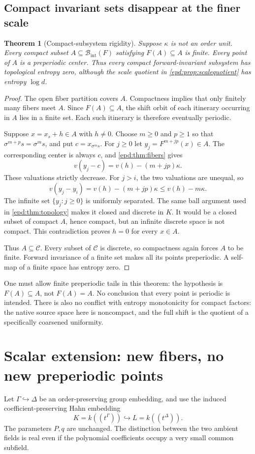 \documentclass[11pt,a4paper]{article}
\numberwithin{equation}{section}
\newtheorem{theorem}{Theorem}[section]
\theoremstyle{plain}
\theoremstyle{definition}
\theoremstyle{remark}
\newcommand{\BI}{\mathcal B_{\mathrm{int}}}
\newcommand{\CS}{\mathcal C}
\newcommand{\sh}{\sigma}
\begin{document}
\subsection{Compact invariant sets disappear at the finer scale}
\begin{theorem}[Compact-subsystem rigidity]\label{epd:thm:compact}
Suppose $\kappa$ is not an order unit. Every compact subset
$A\subseteq\BI(F)$ satisfying $F(A)\subseteq A$ is finite. Every point
of $A$ is a preperiodic center. Thus every compact forward-invariant
subsystem has topological entropy zero, although the scale quotient
in \cref{epd:prop:scalequotient} has entropy $\log d$.
\end{theorem}
\begin{proof}
The open fiber partition covers $A$. Compactness implies that only
finitely many fibers meet $A$. Since $F(A)\subseteq A$, the shift
orbit of each itinerary occurring in $A$ lies in a finite set. Each
such itinerary is therefore eventually periodic.

Suppose $x=x_s+h\in A$ with $h\ne0$. Choose $m\geq0$ and $p\geq1$
so that $\sh^{m+p}s=\sh^m s$, and put $c=x_{\sh^m s}$. For $j\geq0$
let $y_j=F^{m+jp}(x)\in A$. The corresponding center is always $c$,
and \cref{epd:thm:fibers} gives
\[
 v(y_j-c)=v(h)-(m+jp)\kappa.
\]
These valuations strictly decrease. For $j>i$, the two valuations
are unequal, so
\[
 v(y_j-y_i)=v(h)-(m+jp)\kappa\leq v(h)-m\kappa.
\]
The infinite set $\{y_j:j\geq0\}$ is uniformly separated. The same
ball argument used in \cref{epd:thm:topology} makes it closed and discrete
in $K$. It would be a closed subset of compact $A$, hence compact,
but an infinite discrete space is not compact. This contradiction
proves $h=0$ for every $x\in A$.

Thus $A\subseteq\CS$. Every subset of $\CS$ is discrete, so compactness
again forces $A$ to be finite. Forward invariance of a finite set makes
all its points preperiodic. A self-map of a finite space has entropy
zero.
\end{proof}

One must allow finite preperiodic tails in this theorem: the hypothesis
is $F(A)\subseteq A$, not $F(A)=A$. No conclusion that every point is
periodic is intended. There is also no conflict with entropy monotonicity
for compact factors: the native source space here is noncompact, and
the full shift is the quotient of a specifically coarsened uniformity.

\section{Scalar extension: new fibers, no new preperiodic points}
\label{epd:sec:extension}
Let $\Gamma\hookrightarrow\Delta$ be an order-preserving group
embedding, and use the induced coefficient-preserving Hahn embedding
\[
 K=k((t^\Gamma))\hookrightarrow L=k((t^\Delta)).
\]
The parameters $P,q$ are unchanged. The distinction between the two
ambient fields is real even if the polynomial coefficients occupy a
very small common subfield.
\end{document}
